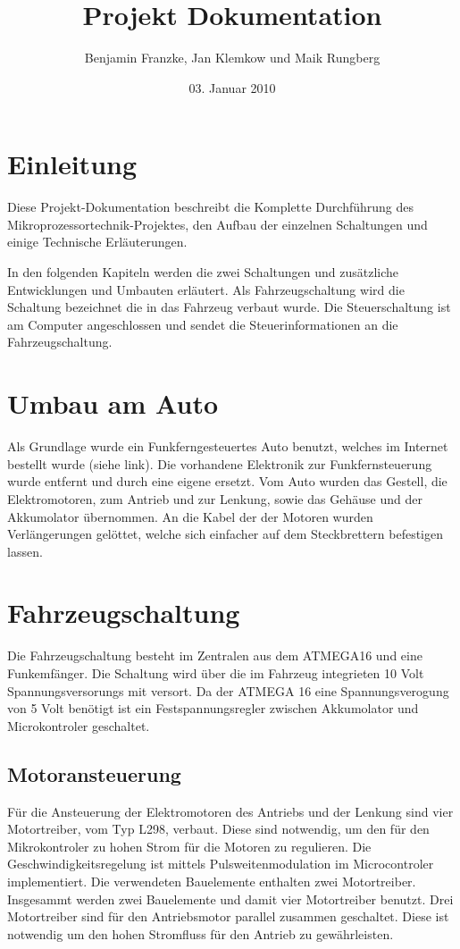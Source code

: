 \documentclass{scrartcl}
\title{Projekt Dokumentation}
\author{Benjamin Franzke, Jan Klemkow und Maik Rungberg}
\date{03. Januar 2010}
\begin{document}
\maketitle
\tableofcontents

\newpage

\section{Einleitung} %
	Diese Projekt-Dokumentation beschreibt die Komplette Durchführung des Mikroprozessortechnik-Projektes,
	den Aufbau der einzelnen Schaltungen und einige Technische Erläuterungen.

	In den folgenden Kapiteln werden die zwei Schaltungen und zusätzliche Entwicklungen und Umbauten erläutert.
	Als Fahrzeugschaltung wird die Schaltung bezeichnet die in das Fahrzeug verbaut wurde.
	Die Steuerschaltung ist am Computer angeschlossen und sendet die Steuerinformationen an die Fahrzeugschaltung.

\section{Umbau am Auto} %
	Als Grundlage wurde ein Funkferngesteuertes Auto benutzt,
	welches im Internet bestellt wurde (siehe link).
	Die vorhandene Elektronik zur Funkfernsteuerung wurde entfernt und durch eine eigene ersetzt.
	Vom Auto wurden das Gestell, die Elektromotoren, zum Antrieb und zur Lenkung,
	sowie das Gehäuse und der Akkumolator übernommen.
	An die Kabel der der Motoren wurden Verlängerungen gelöttet,
	welche sich einfacher auf dem Steckbrettern befestigen lassen.

\newpage

\section{Fahrzeugschaltung} %
	Die Fahrzeugschaltung besteht im Zentralen aus dem ATMEGA16 und eine Funkemfänger.
	Die Schaltung wird über die im Fahrzeug integrieten 10 Volt Spannungsversorungs mit versort.
	Da der ATMEGA 16 eine Spannungsverogung von 5 Volt benötigt ist ein Festspannungsregler
	zwischen Akkumolator und Microkontroler geschaltet.

	\subsection{Motoransteuerung}
		Für die Ansteuerung der Elektromotoren des Antriebs und der Lenkung sind vier Motortreiber, vom Typ L298, verbaut.
		Diese sind notwendig, um den für den Mikrokontroler zu hohen Strom für die Motoren zu regulieren.
		Die Geschwindigkeitsregelung ist mittels Pulsweitenmodulation im Microcontroler implementiert.
		Die verwendeten Bauelemente enthalten zwei Motortreiber. Insgesammt werden zwei Bauelemente und damit vier Motortreiber benutzt.
		Drei Motortreiber sind für den Antriebsmotor parallel zusammen geschaltet.
		Diese ist notwendig um den hohen Stromfluss für den Antrieb zu gewährleisten.
		
\end{document}
